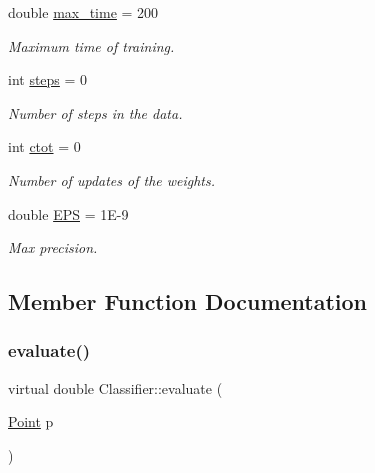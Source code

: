 \begin{DoxyCompactItemize}
double \hyperlink{class_classifier_ae5ada7ce4d5436d1dcff3dff458107fd}{max\+\_\+time} = 200
\begin{DoxyCompactList}\small\item\em Maximum time of training. \end{DoxyCompactList}\item 
\mbox{\label{class_classifier_a1e4c9c9ba059d5aff1d4d81eb41725cb}} 
int \hyperlink{class_classifier_a1e4c9c9ba059d5aff1d4d81eb41725cb}{steps} = 0
\begin{DoxyCompactList}\small\item\em Number of steps in the data. \end{DoxyCompactList}\item 
\mbox{\label{class_classifier_a99d9a7f504212bb3dc2726c10a2333c6}} 
int \hyperlink{class_classifier_a99d9a7f504212bb3dc2726c10a2333c6}{ctot} = 0
\begin{DoxyCompactList}\small\item\em Number of updates of the weights. \end{DoxyCompactList}\item 
\mbox{\label{class_classifier_ad7cd0cfea68461340df2adb0c132dc93}} 
double \hyperlink{class_classifier_ad7cd0cfea68461340df2adb0c132dc93}{E\+PS} = 1\+E-\/9
\begin{DoxyCompactList}\small\item\em Max precision. \end{DoxyCompactList}\end{DoxyCompactItemize}


\subsection{Member Function Documentation}
\mbox{\label{class_classifier_ae8e9554823b85ddc2dcad2955da811d9}} 
\subsubsection{\texorpdfstring{evaluate()}{evaluate()}}
{\footnotesize\ttfamily virtual double Classifier\+::evaluate (\begin{DoxyParamCaption}\item[{\hyperlink{class_point}{Point}}]{p }\end{DoxyParamCaption})\hspace{0.3cm}{\ttfamily [pure virtual]}}



